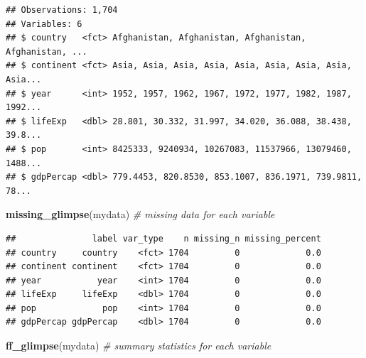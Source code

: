 \documentclass[12pt,]{krantz}
\makeatletter
\newenvironment{Shaded}{\begin{snugshade}}{\end{snugshade}}
\newcommand{\CommentTok}[1]{\textcolor[rgb]{0.56,0.35,0.01}{\textit{#1}}}
\newcommand{\KeywordTok}[1]{\textcolor[rgb]{0.13,0.29,0.53}{\textbf{#1}}}
\newcommand{\NormalTok}[1]{#1}
\newenvironment{kframe}{%
\medskip{}
\setlength{\fboxsep}{.8em}
 \def\at@end@of@kframe{}%
 \ifinner\ifhmode%
  \def\at@end@of@kframe{\end{minipage}}%
  \begin{minipage}{\columnwidth}%
 \fi\fi%
 \def\FrameCommand##1{\hskip\@totalleftmargin \hskip-\fboxsep
 \colorbox{shadecolor}{##1}\hskip-\fboxsep
     \hskip-\linewidth \hskip-\@totalleftmargin \hskip\columnwidth}%
 \MakeFramed {\advance\hsize-\width
   \@totalleftmargin\z@ \linewidth\hsize
   \@setminipage}}%
 {\par\unskip\endMakeFramed%
 \at@end@of@kframe}
\renewenvironment{Shaded}{\begin{kframe}}{\end{kframe}}
\theoremstyle{definition}
\theoremstyle{definition}
\theoremstyle{definition}
\theoremstyle{remark}
\makeatother
\begin{document}
\begin{verbatim}
## Observations: 1,704
## Variables: 6
## $ country   <fct> Afghanistan, Afghanistan, Afghanistan, Afghanistan, ...
## $ continent <fct> Asia, Asia, Asia, Asia, Asia, Asia, Asia, Asia, Asia...
## $ year      <int> 1952, 1957, 1962, 1967, 1972, 1977, 1982, 1987, 1992...
## $ lifeExp   <dbl> 28.801, 30.332, 31.997, 34.020, 36.088, 38.438, 39.8...
## $ pop       <int> 8425333, 9240934, 10267083, 11537966, 13079460, 1488...
## $ gdpPercap <dbl> 779.4453, 820.8530, 853.1007, 836.1971, 739.9811, 78...
\end{verbatim}

\begin{Shaded}
\begin{Highlighting}[]
\KeywordTok{missing_glimpse}\NormalTok{(mydata) }\CommentTok{# missing data for each variable}
\end{Highlighting}
\end{Shaded}

\begin{verbatim}
##               label var_type    n missing_n missing_percent
## country     country    <fct> 1704         0             0.0
## continent continent    <fct> 1704         0             0.0
## year           year    <int> 1704         0             0.0
## lifeExp     lifeExp    <dbl> 1704         0             0.0
## pop             pop    <int> 1704         0             0.0
## gdpPercap gdpPercap    <dbl> 1704         0             0.0
\end{verbatim}

\begin{Shaded}
\begin{Highlighting}[]
\KeywordTok{ff_glimpse}\NormalTok{(mydata) }\CommentTok{# summary statistics for each variable}
\end{Highlighting}
\end{Shaded}
\end{document}
